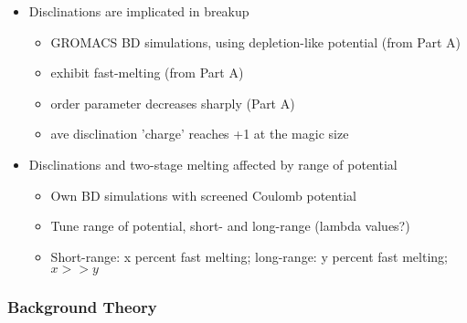 \documentclass[11pt]{article}
\begin{document}
\begin{itemize}

\item Disclinations are implicated in breakup\\
\label{sec-3.1.4.1}

\begin{itemize}

\item GROMACS BD simulations, using depletion-like potential (from Part A)\\
\label{sec-3.1.4.1.1}


\item exhibit fast-melting (from Part A)\\
\label{sec-3.1.4.1.2}


\item order parameter decreases sharply (Part A)\\
\label{sec-3.1.4.1.3}


\item ave disclination 'charge' reaches +1 at the magic size\\
\label{sec-3.1.4.1.4}

\end{itemize} %

\item Disclinations and two-stage melting affected by range of potential\\
\label{sec-3.1.4.2}

\begin{itemize}

\item Own BD simulations with screened Coulomb potential\\
\label{sec-3.1.4.2.1}


\item Tune range of potential, short- and long-range (lambda values?)\\
\label{sec-3.1.4.2.2}


\item Short-range: x percent fast melting; long-range: y percent fast melting; $x>>y$\\
\label{sec-3.1.4.2.3}

\end{itemize} %
\end{itemize} %
\subsubsection{Background Theory}
\label{sec-3.1.5}
\end{document}
